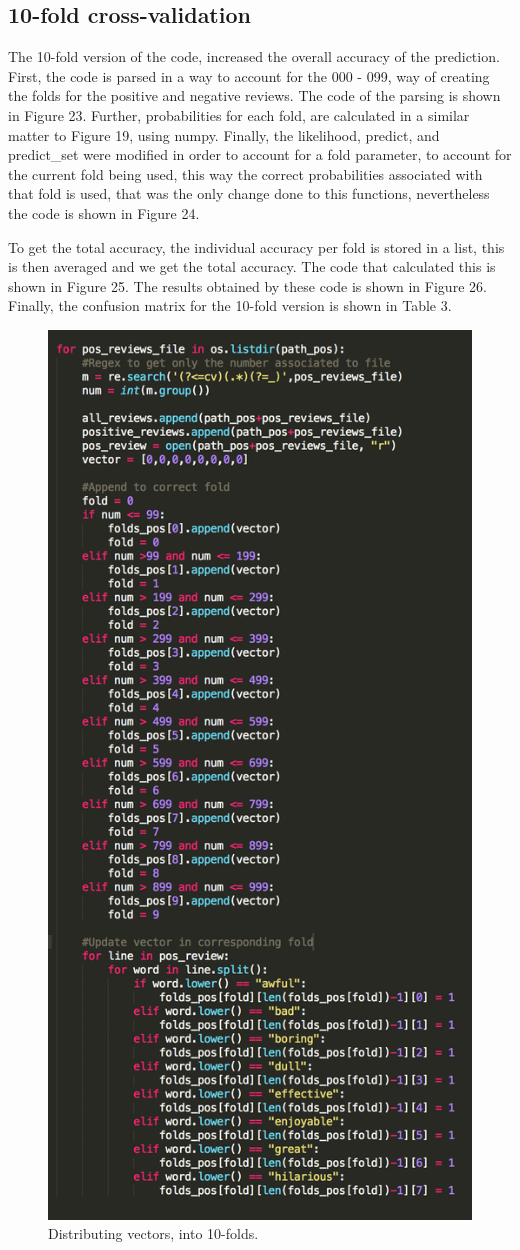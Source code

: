 \documentclass[12pt, letter]{article}
\begin{document}
\subsection{10-fold cross-validation}

The 10-fold version of the code, increased the overall accuracy of the prediction. First, the code is parsed in a way to account for the 000 - 099, way of creating the folds for the positive and negative reviews. The code of the parsing is shown in Figure 23. Further, probabilities for each fold, are calculated in a similar matter to Figure 19, using numpy. Finally, the likelihood, predict, and predict\_set were modified in order to account for a fold parameter, to account for the current fold being used, this way the correct probabilities associated with that fold is used, that was the only change done to this functions, nevertheless the code is shown in Figure 24. 

To get the total accuracy, the individual accuracy per fold is stored in a list, this is then averaged and we get the total accuracy. The code that calculated this is shown in Figure 25. The results obtained by these code is shown in Figure 26. Finally, the confusion matrix for the 10-fold version is shown in Table 3. 

 \begin{figure}[htb]
  \centering
  \includegraphics[width=0.6 \textwidth]{./figures/folds.png}
  \caption{Distributing vectors, into 10-folds.}
\end{figure}
\end{document}
